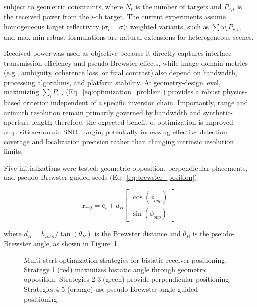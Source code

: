 \documentclass[conference]{IEEEtran}
\begin{document}
subject to geometric constraints, where $N_t$ is the number of targets and $P_{r,i}$ is the received power from the $i$-th target. The current experiments assume homogeneous target reflectivity ($\sigma_i = \sigma$); weighted variants, such as $\sum w_i P_{r,i}$, and max-min robust formulations are natural extensions for heterogeneous scenes.

Received power was used as objective because it directly captures interface transmission efficiency and pseudo-Brewster effects, while image-domain metrics (e.g., ambiguity, coherence loss, or final contrast) also depend on bandwidth, processing algorithms, and platform stability. At geometry-design level, maximizing $\sum_i P_{r,i}$ (Eq.~\ref{eq:optimization_problem}) provides a robust physics-based criterion independent of a specific inversion chain. Importantly, range and azimuth resolution remain primarily governed by bandwidth and synthetic-aperture length; therefore, the expected benefit of optimization is improved acquisition-domain SNR margin, potentially increasing effective detection coverage and localization precision rather than changing intrinsic resolution limits.

Five initializations were tested: geometric opposition, perpendicular placements, and pseudo-Brewster-guided seeds (Eq.~\ref{eq:brewster_position}).

\begin{equation}
\mathbf{r}_{ref} = \mathbf{c}_t + d_B \begin{bmatrix} \cos(\phi_{opp}) \\ \sin(\phi_{opp}) \end{bmatrix}
\label{eq:brewster_position}
\end{equation}

where $d_B = h_{total}/\tan(\theta_B)$ is the Brewster distance and $\theta_B$ is the pseudo-Brewster angle, as shown in Figure~\ref{fig:optimization_strategies}.

\begin{figure}[ht]
\centering
\scalebox{0.55}{}
\caption{Multi-start optimization strategies for bistatic receiver positioning. Strategy 1 (red) maximizes bistatic angle through geometric opposition. Strategies 2-3 (green) provide perpendicular positioning. Strategies 4-5 (orange) use pseudo-Brewster angle-guided positioning.}
\label{fig:optimization_strategies}
\end{figure}
\end{document}

